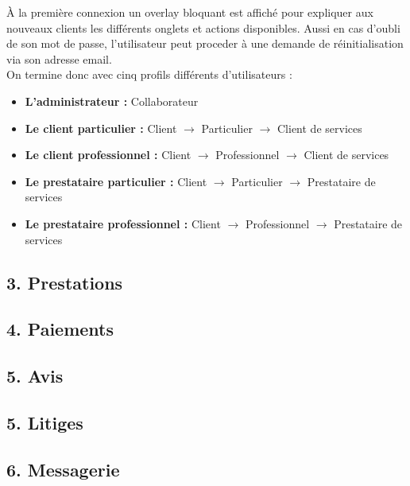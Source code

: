 \documentclass{report}
\begin{document}
\noindent À la première connexion un overlay bloquant est affiché pour expliquer aux nouveaux clients les différents onglets et actions disponibles. Aussi en cas d'oubli de son mot de passe, l'utilisateur peut proceder à une demande de réinitialisation via son adresse email. \\

\noindent On termine donc avec cinq profils différents d'utilisateurs :
\begin{itemize}
    \item \textbf{L’administrateur :} Collaborateur
    \item \textbf{Le client particulier :} Client $\rightarrow$ Particulier $\rightarrow$ Client de services
    \item \textbf{Le client professionnel :} Client $\rightarrow$ Professionnel $\rightarrow$ Client de services
    \item \textbf{Le prestataire particulier :} Client $\rightarrow$ Particulier $\rightarrow$ Prestataire de services
    \item \textbf{Le prestataire professionnel :} Client $\rightarrow$ Professionnel $\rightarrow$ Prestataire de services
\end{itemize}

\subsection*{3. Prestations} 
\vspace{0.2cm} %
\subsection*{4. Paiements}
\vspace{0.2cm}
\subsection*{5. Avis}
\vspace{0.2cm}
\subsection*{5. Litiges}
\vspace{0.2cm}
\subsection*{6. Messagerie}
\vspace{0.2cm}
\end{document}
